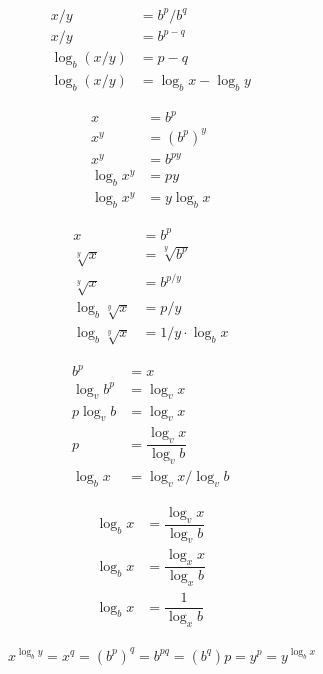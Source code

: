 \begin{align}
  x/y &= b^p/b^q &&\\
  x/y &= b^{p-q} \nonumber&&\\
  \log_b(x/y) &= p-q \nonumber&&\\
  \log_b(x/y) &= \log_b{x}-\log_b{y} \nonumber
\end{align}

\begin{align}
  x &= b^p &&\\
  x^y &= (b^p)^y \nonumber&&\\
  x^y &= b^{py} \nonumber&&\\
  \log_b{x^y} &= py \nonumber&&\\
  \log_b{x^y} &= y\log_b{x} \nonumber
\end{align}

\begin{align}
  x &= b^p &&\\
  \sqrt[y]{x} &= \sqrt[y]{b^p} \nonumber&&\\
  \sqrt[y]{x} &= b^{p/y} \nonumber&&\\
  \log_b \sqrt[y]{x} &= p/y \nonumber&&\\
  \log_b \sqrt[y]{x} &= 1/y\cdot \log_b{x} \nonumber
\end{align}

\begin{align}
  b^p &= x &\\
  \log_v{b^p} &= \log_v{x} \nonumber&&\\
  p\log_v{b} &= \log_v{x} \nonumber&&\\
  p &= \dfrac{\log_v{x}}{\log_v{b}} \nonumber&&\\
  \log_b{x} &= \log_v{x}/\log_v{b} \nonumber
\end{align}

\begin{align}
  \log_b{x} &= \dfrac{\log_v{x}}{\log_v{b}} &&\\
  \log_b{x} &= \dfrac{\log_x{x}}{\log_x{b}} \nonumber&&\\
  \log_b{x} &= \dfrac{1}{\log_x{b}} \nonumber
\end{align}

\begin{align}
  x^{\log_b{y}}=x^q=(b^p)^q=b^{pq}=(b^q)p=y^p=y^{\log_b{x}}
\end{align}
